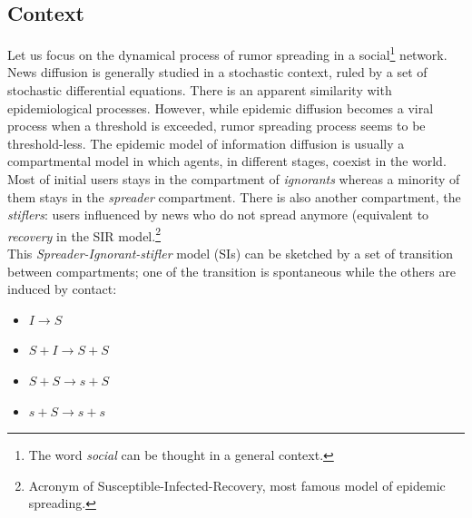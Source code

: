 \subsection{Context}
Let us focus on the dynamical process of rumor spreading in a social\footnote{The word \textit{social} can be thought in a general context.} network.
\\ News diffusion is generally studied in a stochastic context, ruled by a set of stochastic differential equations.\cite{chen2013information}
 There is an apparent similarity with epidemiological processes. 
However, while epidemic diffusion becomes a viral process when a threshold is exceeded, rumor spreading process seems to be threshold-less.
 The epidemic model of information diffusion is usually a compartmental model in which agents, in different stages, coexist in the world.\cite{barrat2008dynamical}
 Most of initial users stays in the compartment of \textit{ignorants} whereas a minority of them stays in the \textit{spreader} compartment.
 There is also another compartment, the \textit{stiflers}: users influenced by news who do not spread anymore (equivalent to \textit{recovery} in the SIR model.\footnote{Acronym of Susceptible-Infected-Recovery, most famous model of epidemic spreading.}
\\ This \textit{Spreader-Ignorant-stifler} model (SIs) can be sketched by a set of transition between compartments; one of the transition is spontaneous while the others are induced by contact:
\begin{itemize}
\item$ I \longrightarrow S$
\item $S+I \longrightarrow S + S$

\item $S + S \longrightarrow s + S$

\item $s + S \longrightarrow  s + s$
\end{itemize}

